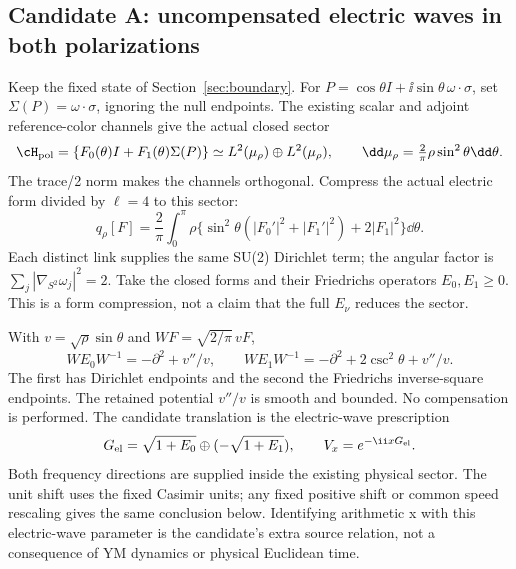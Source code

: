 \subsection{Candidate A: uncompensated electric waves in both polarizations}
Keep the fixed state of Section~\ref{sec:boundary}. For
$P=\cos\theta I+\ii\sin\theta\,\omega\cdot\sigma$, set
$\Sigma(P)=\omega\cdot\sigma$, ignoring the null endpoints.
The existing scalar and adjoint reference-color channels give
the actual closed sector
\begin{equation}
\cH_{\rm pol}=\{F_0(\theta)I+F_1(\theta)\Sigma(P)\}
\simeq L^2(\mu_\rho)\oplus L^2(\mu_\rho),\qquad
\dd\mu_\rho=\tfrac2\pi\rho\sin^2\theta\dd\theta.
\end{equation}
The trace/2 norm makes the channels orthogonal. Compress the
actual electric form divided by $\ell=4$ to this sector:
\begin{equation}\label{eq:polar-electric}
q_\rho[F]=\frac2\pi\int_0^\pi\rho\{
\sin^2\theta(|F_0'|^2+|F_1'|^2)+2|F_1|^2\}\dd\theta.
\end{equation}
Each distinct link supplies the same SU(2) Dirichlet term;
the angular factor is $\sum_j|\nabla_{S^2}\omega_j|^2=2$.
Take the closed forms and their Friedrichs operators
$E_0,E_1\ge0$. This is a form compression, not a claim that
the full $E_\nu$ reduces the sector.

With $v=\sqrt\rho\sin\theta$ and $WF=\sqrt{2/\pi}\,vF$,
\begin{equation}\label{eq:polar-liouville}
WE_0W^{-1}=-\partial^2+v''/v,\qquad
WE_1W^{-1}=-\partial^2+2\csc^2\theta+v''/v.
\end{equation}
The first has Dirichlet endpoints and the second the
Friedrichs inverse-square endpoints. The retained potential
$v''/v$ is smooth and bounded. No compensation is performed.
The candidate translation is the electric-wave prescription
\begin{equation}\label{eq:electric-wave}
G_{\rm el}=\sqrt{1+E_0}\oplus(-\sqrt{1+E_1}),\qquad
V_x=e^{-\ii xG_{\rm el}}.
\end{equation}
Both frequency directions are supplied inside the existing
physical sector. The unit shift uses the fixed Casimir units;
any fixed positive shift or common speed rescaling gives the
same conclusion below. Identifying arithmetic x with this
electric-wave parameter is the candidate's extra source relation,
not a consequence of YM dynamics or physical Euclidean time.

